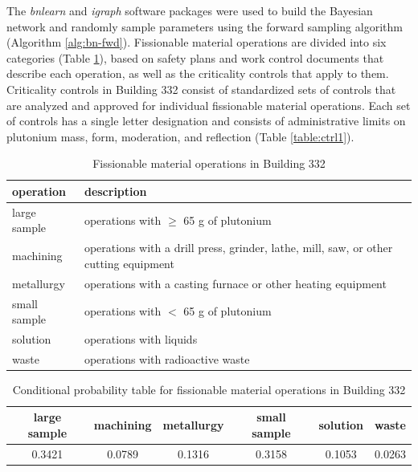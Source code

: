 The \textit{bnlearn} \cite{bnlearn} and \textit{igraph} \cite{igraph} software packages were used to build the Bayesian network and randomly sample parameters using the forward sampling algorithm (Algorithm \ref{alg:bn-fwd}).
Fissionable material operations are divided into six categories (Table \ref{table:op1}), based on safety plans and work control documents that describe each operation, as well as the criticality controls that apply to them.
Criticality controls in Building 332 consist of standardized sets of controls that are analyzed and approved for individual fissionable material operations.
Each set of controls has a single letter designation and consists of administrative limits on plutonium mass, form, moderation, and reflection (Table \ref{table:ctrl1}).
%
\begin{table}
  \caption{Fissionable material operations in Building 332}
  \label{table:op1}
  \renewcommand\arraystretch{1.5}
  \begin{center}
    \begin{tabular}{|l p{10.16cm}|}
      \hline
      operation    & description \\
      \hline
      large sample & operations with $\geq$ 65 g of plutonium \\
      machining    & operations with a drill press, grinder, lathe, mill, saw, or other cutting equipment \\
      metallurgy   & operations with a casting furnace or other heating equipment \\ 
      small sample & operations with $<$ 65 g of plutonium \\
      solution     & operations with liquids \\
      waste        & operations with radioactive waste \\
      \hline
    \end{tabular}
  \end{center}
\end{table}

\begin{table}
  \caption{Conditional probability table for fissionable material operations in Building 332}
  \label{table:op2}
  \renewcommand\arraystretch{1.5}
  \begin{center}
    \begin{tabular}{|c c c c c c|}
      \hline
      large sample & machining & metallurgy & small sample & solution & waste \\
      \hline
      0.3421       & 0.0789    & 0.1316     & 0.3158       & 0.1053   & 0.0263 \\
      \hline
    \end{tabular}
  \end{center}
\end{table}

